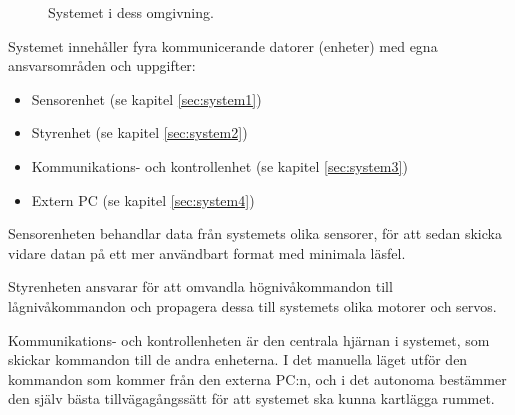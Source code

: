 \documentclass[a4paper,11pt]{article}
\begin{document}
\begin{figure}[h!]
    \caption{Systemet i dess omgivning.}
    \label{fig:overview}
\end{figure}

\noindent
Systemet innehåller fyra kommunicerande datorer (enheter) med egna ansvarsområden och uppgifter:

\begin{itemize}
\item Sensorenhet (se kapitel \ref{sec:system1})
\item Styrenhet (se kapitel \ref{sec:system2})
\item Kommunikations- och kontrollenhet (se kapitel \ref{sec:system3})
\item Extern PC (se kapitel \ref{sec:system4})
\end{itemize}

\noindent
Sensorenheten behandlar data från systemets olika sensorer, för att sedan skicka vidare datan på ett mer användbart format med minimala läsfel.

Styrenheten ansvarar för att omvandla högnivåkommandon till lågnivåkommandon och propagera dessa till systemets olika motorer och servos.

Kommunikations- och kontrollenheten är den centrala hjärnan i systemet, som skickar kommandon till de andra enheterna. I det manuella läget utför den kommandon som kommer från den externa PC:n, och i det autonoma bestämmer den själv bästa tillvägagångssätt för att systemet ska kunna kartlägga rummet.
\end{document}
